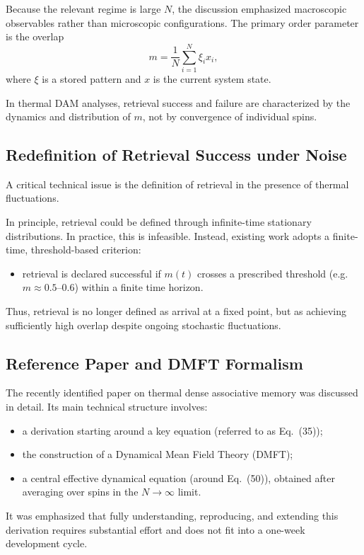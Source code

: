 \documentclass[11pt,a4paper]{article}
\begin{document}
Because the relevant regime is large \(N\), the discussion emphasized macroscopic observables rather than microscopic configurations. The primary order parameter is the overlap
\[
m = \frac{1}{N}\sum_{i=1}^{N} \xi_i x_i,
\]
where \(\xi\) is a stored pattern and \(x\) is the current system state.

In thermal DAM analyses, retrieval success and failure are characterized by the dynamics and distribution of \(m\), not by convergence of individual spins.

\subsection{Redefinition of Retrieval Success under Noise}

A critical technical issue is the definition of retrieval in the presence of thermal fluctuations.

In principle, retrieval could be defined through infinite-time stationary distributions. In practice, this is infeasible. Instead, existing work adopts a finite-time, threshold-based criterion:
\begin{itemize}
    \item retrieval is declared successful if \(m(t)\) crosses a prescribed threshold (e.g.\ \(m \approx 0.5\)–\(0.6\)) within a finite time horizon.
\end{itemize}

Thus, retrieval is no longer defined as arrival at a fixed point, but as achieving sufficiently high overlap despite ongoing stochastic fluctuations.

\subsection{Reference Paper and DMFT Formalism}

The recently identified paper on thermal dense associative memory was discussed in detail. Its main technical structure involves:
\begin{itemize}
    \item a derivation starting around a key equation (referred to as Eq.~(35));
    \item the construction of a Dynamical Mean Field Theory (DMFT);
    \item a central effective dynamical equation (around Eq.~(50)), obtained after averaging over spins in the \(N \to \infty\) limit.
\end{itemize}

It was emphasized that fully understanding, reproducing, and extending this derivation requires substantial effort and does not fit into a one-week development cycle.
\end{document}
